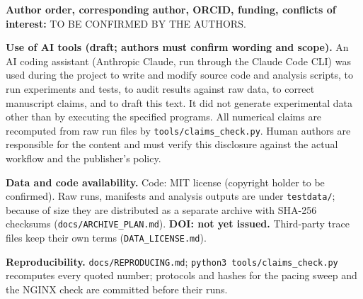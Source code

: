 \documentclass[conference]{IEEEtran}
\begin{document}
\textbf{Author order, corresponding author, ORCID, funding, conflicts of interest:} TO BE CONFIRMED BY THE AUTHORS.


\textbf{Use of AI tools (draft; authors must confirm wording and scope).} An AI coding assistant (Anthropic Claude, run through the Claude Code CLI) was used during the project to write and modify source code and analysis scripts, to run experiments and tests, to audit results against raw data, to correct manuscript claims, and to draft this text. It did not generate experimental data other than by executing the specified programs. All numerical claims are recomputed from raw run files by \texttt{tools/\allowbreak{}claims\_check.py}. Human authors are responsible for the content and must verify this disclosure against the actual workflow and the publisher's policy.


\textbf{Data and code availability.} Code: MIT license (copyright holder to be confirmed). Raw runs, manifests and analysis outputs are under \texttt{testdata/\allowbreak{}}; because of size they are distributed as a separate archive with SHA-256 checksums (\texttt{docs/\allowbreak{}ARCHIVE\_PLAN.md}). \textbf{DOI: not yet issued.} Third-party trace files keep their own terms (\texttt{DATA\_\allowbreak{}LICENSE.md}).


\textbf{Reproducibility.} \texttt{docs/\allowbreak{}REPRODUCING.md}; \texttt{python3 tools/\allowbreak{}claims\_check.py} recomputes every quoted number; protocols and hashes for the pacing sweep and the NGINX check are committed before their runs.





\end{document}
